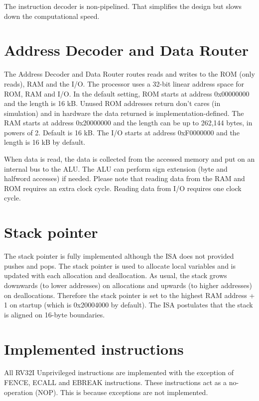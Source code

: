 \documentclass[12pt]{article}
\begin{document}
The instruction decoder is non-pipelined. That simplifies the design but slows down the computational speed.

\section{Address Decoder and Data Router}
\label{sec:addressdecoderanddatarouter}
The Address Decoder and Data Router routes reads and writes to the ROM (only reads), RAM and the I/O. The processor uses a 32-bit linear address space for ROM, RAM and I/O. In the default setting, ROM starts at address 0x00000000 and the length is 16 kB. Unused ROM addresses return don't cares (in simulation) and in hardware the data returned is implementation-defined. The RAM starts at address 0x20000000 and the length can be up to 262,144 bytes, in powers of 2. Default is 16 kB. The I/O starts at address 0xF0000000 and the length is 16 kB by default.

When data is read, the data is collected from the accessed memory and put on an internal bus to the ALU. The ALU can perform sign extension (byte and halfword accesses) if needed. Please note that reading data from the RAM and ROM requires an extra clock cycle. Reading data from I/O requires one clock cycle.

\section{Stack pointer}
The stack pointer is fully implemented although the ISA does not provided pushes and pops. The stack pointer is used to allocate local variables and is updated with each allocation and deallocation. As usual, the stack grows downwards (to lower addresses) on allocations and upwards (to higher addresses) on deallocations. Therefore the stack pointer is set to the highest RAM address + 1 on startup (which is 0x20004000 by default). The ISA postulates that the stack is aligned on 16-byte boundaries.

\section{Implemented instructions}
All RV32I Unprivileged instructions are implemented with the exception of FENCE, ECALL and EBREAK instructions. These instructions act as a no-operation (NOP). This is because exceptions are not implemented.
\end{document}
